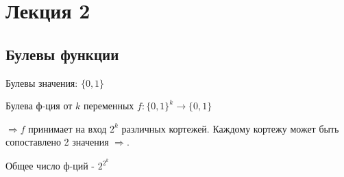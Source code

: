 \section{Лекция 2}

\subsection{Булевы функции}

Булевы значения: $\{0, 1\}$

Булева ф-ция от $k$ переменных $f: \{0, 1\}^{k} \rightarrow \{0, 1\}$

$\Rightarrow f$ принимает на вход $2^{k}$ различных кортежей. Каждому кортежу может быть сопоставлено 2 значения $\Rightarrow$. 

Общее число ф-ций - $2^{2^{k}}$

